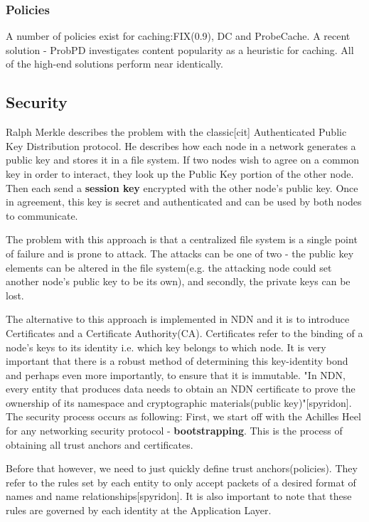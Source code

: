 \subsubsection{Policies}
A number of policies exist for caching:FIX(0.9), DC and ProbeCache. A recent solution - ProbPD investigates content popularity as a heuristic for caching. All of the high-end solutions perform near identically.
\subsection{Security}
Ralph Merkle describes the problem with the classic[cit] Authenticated Public Key Distribution protocol. He describes how each node in a network generates a public key and stores it in a file system. If two nodes wish to agree on a common key in order to interact, they look up the Public Key portion of the other node. Then each send a \textbf{session key} encrypted with the other node's public key. Once in agreement, this key is secret and authenticated and can be used by both nodes to communicate. 

The problem with this approach is that a centralized file system is a single point of failure and is prone to attack. The attacks can be one of two - the public key elements can be altered in the file system(e.g. the attacking node could set another node's public key to be its own), and secondly, the private keys can be lost.

 The alternative to this approach is implemented in NDN and it is to introduce Certificates and a Certificate Authority(CA). Certificates refer to the binding of a node's keys to its identity i.e. which key belongs to which node. It is very important that there is a robust method of determining this key-identity bond and perhaps even more importantly, to ensure that it is immutable. "In NDN, every entity that produces data needs to obtain an NDN certificate to prove the ownership of its namespace and cryptographic materials(public key)"[spyridon].
 The security process occurs as following: First, we start off with the Achilles Heel for any networking security protocol - \textbf{bootstrapping}. This is the process of obtaining all trust anchors and certificates. 
	 
 Before that however, we need to just quickly define trust anchors(policies). They refer to the rules set by each entity to only accept packets of a desired format of names and name relationships[spyridon]. It is also important to note that these rules are governed by each identity at the Application Layer.
 
